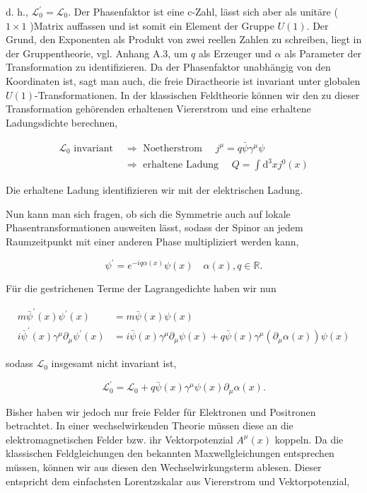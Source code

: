 \documentclass[10pt, letterpaper]{article}
\begin{document}
d. h., $\mathscr{L}_{0}^{\prime}=\mathscr{L}_{0}$. Der Phasenfaktor ist eine c-Zahl, lässt sich aber als unitäre ( $1 \times 1$ )Matrix auffassen und ist somit ein Element der Gruppe $U(1)$. Der Grund, den Exponenten als Produkt von zwei reellen Zahlen zu schreiben, liegt in der Gruppentheorie, vgl. Anhang A.3, um $q$ als Erzeuger und $\alpha$ als Parameter der Transformation zu identifizieren. Da der Phasenfaktor unabhängig von den Koordinaten ist, sagt man auch, die freie Diractheorie ist invariant unter globalen $U(1)$-Transformationen. In der klassischen Feldtheorie können wir den zu dieser Transformation gehörenden erhaltenen Viererstrom und eine erhaltene Ladungsdichte berechnen,

$$
\begin{aligned}
\mathscr{L}_{0} \text { invariant } & \Rightarrow \text { Noetherstrom } \quad j^{\mu}=q \bar{\psi} \gamma^{\mu} \psi \\
& \Rightarrow \text { erhaltene Ladung } \quad Q=\int \mathrm{d}^{3} x j^{0}(x)
\end{aligned}
$$

Die erhaltene Ladung identifizieren wir mit der elektrischen Ladung.

Nun kann man sich fragen, ob sich die Symmetrie auch auf lokale Phasentransformationen ausweiten lässt, sodass der Spinor an jedem Raumzeitpunkt mit einer anderen Phase multipliziert werden kann,

$$
\psi^{\prime}=e^{-i q \alpha(x)} \psi(x) \quad \alpha(x), q \in \mathbb{R} .
$$

Für die gestrichenen Terme der Lagrangedichte haben wir nun

$$
\begin{aligned}
m \bar{\psi}^{\prime}(x) \psi^{\prime}(x) & =m \bar{\psi}(x) \psi(x) \\
i \bar{\psi}^{\prime}(x) \gamma^{\mu} \partial_{\mu} \psi^{\prime}(x) & =i \bar{\psi}(x) \gamma^{\mu} \partial_{\mu} \psi(x)+q \bar{\psi}(x) \gamma^{\mu}\left(\partial_{\mu} \alpha(x)\right) \psi(x)
\end{aligned}
$$

sodass $\mathscr{L}_{0}$ insgesamt nicht invariant ist,

$$
\mathscr{L}_{0}^{\prime}=\mathscr{L}_{0}+q \bar{\psi}(x) \gamma^{\mu} \psi(x) \partial_{\mu} \alpha(x) .
$$

Bisher haben wir jedoch nur freie Felder für Elektronen und Positronen betrachtet. In einer wechselwirkenden Theorie müssen diese an die elektromagnetischen Felder bzw. ihr Vektorpotenzial $A^{\mu}(x)$ koppeln. Da die klassischen Feldgleichungen den bekannten Maxwellgleichungen entsprechen müssen, können wir aus diesen den Wechselwirkungsterm ablesen. Dieser entspricht dem einfachsten Lorentzskalar aus Viererstrom und Vektorpotenzial,
\end{document}
